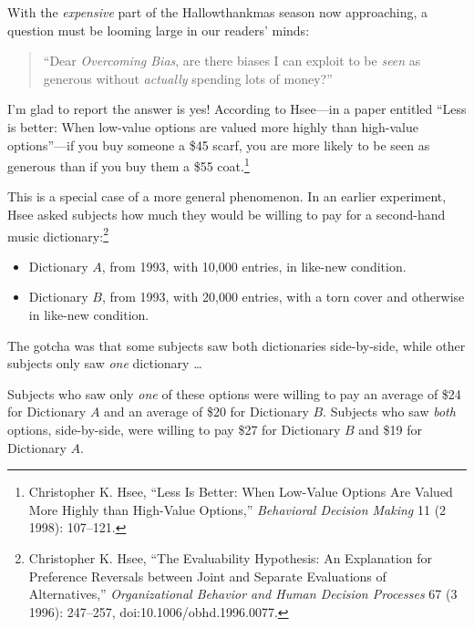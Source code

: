 \myendsectiontext


\bigskip


{
 With the \textit{expensive} part of the Hallowthankmas season now
approaching, a question must be looming large in our
readers' minds:}

\begin{quote}
{
 ``Dear \textit{Overcoming Bias}, are there biases
I can exploit to be \textit{seen} as generous without \textit{actually}
spending lots of money?''}
\end{quote}

{
 I'm glad to report the answer is yes! According to
Hsee---in a paper entitled ``Less is better: When
low-value options are valued more highly than high-value
options''---if you buy someone a \$45 scarf, you are
more likely to be seen as generous than if you buy them a \$55
coat.\footnote{Christopher K. Hsee, ``Less Is Better: When
Low-Value Options Are Valued More Highly than High-Value
Options,'' \textit{Behavioral Decision Making} 11 (2
1998): 107--121.}}

{
 This is a special case of a more general phenomenon. In an earlier
experiment, Hsee asked subjects how much they would be willing to pay
for a second-hand music dictionary:\footnote{Christopher K. Hsee, ``The Evaluability
Hypothesis: An Explanation for Preference Reversals between Joint and
Separate Evaluations of Alternatives,''
\textit{Organizational Behavior and Human Decision Processes} 67 (3
1996): 247--257, doi:10.1006/obhd.1996.0077.}}

\begin{itemize}
\item {
 Dictionary $A$, from 1993, with 10,000 entries, in like-new
condition.}

\item {
 Dictionary $B$, from 1993, with 20,000 entries, with a torn cover
 and otherwise in like-new condition.}
\end{itemize}

{
 The gotcha was that some subjects saw both dictionaries
side-by-side, while other subjects only saw \textit{one} dictionary
\ldots}

{
 Subjects who saw only \textit{one} of these options were willing
to pay an average of \$24 for Dictionary $A$ and an average of \$20 for
Dictionary $B$. Subjects who saw \textit{both} options, side-by-side,
were willing to pay \$27 for Dictionary $B$ and \$19 for Dictionary $A$.}

